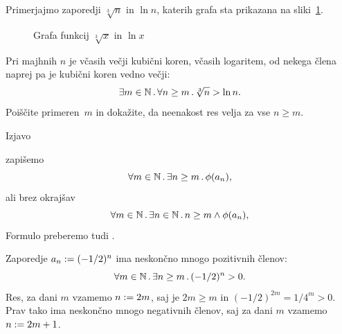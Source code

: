 \begin{zgled}
  Primerjajmo zaporedji $\sqrt[3]{n}$ in $\ln n$, katerih grafa sta prikazana na
  sliki~\ref{fig:koren-logaritem}.
  \begin{figure}[ht]
    \centering
    \caption{Grafa funkcij $\sqrt[3]{x}$ in $\ln x$}
    \label{fig:koren-logaritem}
  \end{figure}
  Pri majhnih $n$ je včasih večji kubični koren, včasih logaritem, od nekega člena naprej pa je kubični koren vedno večji:
  \begin{equation*}
    \exists m \in \mathbb{N} \,.\, \forall n \geq m \,.\, \sqrt[3]{n} > \ln n.
  \end{equation*}
  Poiščite primeren~$m$ in dokažite, da neenakost res velja za vse $n \geq m$.
\end{zgled}

Izjavo
%
\begin{quote}
\end{quote}
%
zapišemo
%
\begin{equation*}
  \forall m \in \mathbb{N} \,.\, \exists n \geq m \,.\, \phi(a_n),
\end{equation*}
%
ali brez okrajšav
%
\begin{equation*}
  \forall m \in \mathbb{N} \,.\, \exists n \in \mathbb{N} \,.\, n \geq m \land \phi(a_n),
\end{equation*}
%
Formulo preberemo tudi .

\begin{zgled}
  Zaporedje $a_n \mathrel{{:}{=}} (-1/2)^n$ ima neskončno mnogo pozitivnih členov:
  \begin{equation*}
    \forall m \in \mathbb{N} \,.\, \exists n \geq m \,.\, (-1/2)^n > 0.
  \end{equation*}
  Res, za dani $m$ vzamemo $n \mathrel{{:}{=}} 2 m$, saj je $2 m \geq m$ in $(-1/2)^{2 m} = 1/4^m > 0$.
  Prav tako ima neskončno mnogo negativnih členov, saj za dani $m$ vzamemo $n \mathrel{{:}{=}} 2 m + 1$.
\end{zgled}

